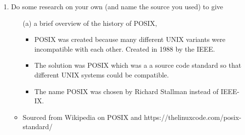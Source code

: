 \documentclass{article}
\begin{document}
\begin{enumerate}
    \item  Do some research on your own (and name the source you used) to give
    \begin{itemize}
        \item[(a)] a brief overview of the history of POSIX,
        
        \begin{itemize}
            \item POSIX was created because many different UNIX variants were incompatible with each other. Created in 1988 by the IEEE.
            \item The solution was POSIX which was a a source code standard so that different UNIX systems could be compatible.
            \item The name POSIX was chosen by Richard Stallman instead of IEEE-IX.
        \end{itemize}

        \item Sourced from Wikipedia on POSIX and https://thelinuxcode.com/posix-standard/
    \end{itemize}

\end{enumerate}
\end{document}

